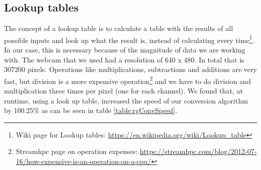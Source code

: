 \subsection{Lookup tables}
The concept of a lookup table is to calculate a table with the results of all possible inputs and look up what the result is, instead of calculating every time\footnote{Wiki page for Lookup tables: \url{https://en.wikipedia.org/wiki/Lookup_table}}. In our case, this is necessary because of the magnitude of data we are working with. The webcam that we used had a resolution of 640 x 480. In total that is 307200 pixels. Operations like multiplications, subtractions and additions are very fast, but division is a more expensive operation\footnote{Streamhpc page on operation expenses: \url{https://streamhpc.com/blog/2012-07-16/how-expensive-is-an-operation-on-a-cpu/}} and we have to do division and multiplication three times per pixel (one for each channel). We found that, at runtime, using a look up table, increased the speed of our conversion algorithm by 100.25\% as can be seen in table \ref{table:rgConvSpeed}.\\
